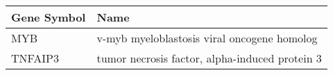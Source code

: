 \begin{tabular}{ll}
\toprule
Gene Symbol &                                           Name \\
\midrule
        MYB &    v-myb myeloblastosis viral oncogene homolog \\
    TNFAIP3 & tumor necrosis factor, alpha-induced protein 3 \\
\bottomrule
\end{tabular}
